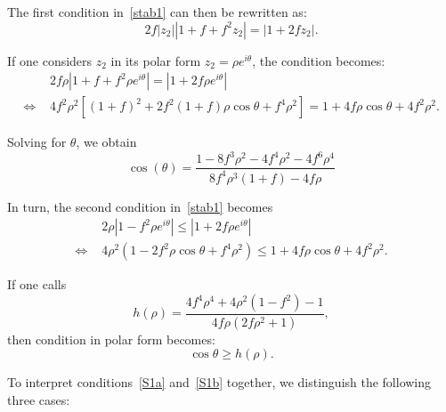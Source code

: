 \documentclass[10pt]{article}
\begin{document}
The first condition in~\eqref{stab1}  can then be rewritten as:
\[
2 f |z_2| |1 + f + f^2 z_2| = |1 + 2 f z_2|.
\]

If one considers $z_2$ in its polar form $z_2 = \rho e^{i\theta}$, the condition becomes:
\[
\begin{aligned}
&
    2 f \rho |1 + f + f^2 \rho e^{i \theta}| = |1 + 2 f \rho e^{i\theta}| \\
\iff\,\, &
    4 f^2 \rho^2 [(1 + f)^2 + 2 f^2 (1 + f) \rho \cos \theta + f^4 \rho^2]
    = 1 + 4 f \rho \cos \theta + 4 f^2 \rho^2.
\end{aligned}
\]

Solving for $\theta$, we obtain
\begin{equation} \label{S1a}
\cos(\theta) =
    \frac{1 - 8 f^3 \rho^2 - 4 f^4 \rho^2 - 4 f^6 \rho^4}{8 f^4 \rho^3 (1 + f) - 4 f \rho}
     \tag{S1a}
\end{equation}

In turn, the second condition in~\eqref{stab1} becomes
\[
\begin{aligned}
&
    2 \rho |1 - f^2 \rho e^{i\theta} |
    \leq |1 + 2 f \rho e^{i\theta}| \\
\iff\,\, &
    4 \rho^2 (1 - 2 f^2 \rho \cos \theta + f^4 \rho^2)
    \leq 1 + 4 f \rho \cos \theta + 4 f^2 \rho^2.
\end{aligned}
\]

If one calls
\begin{equation}
h(\rho) = \frac{4 f^4 \rho^4+4\rho^2(1-f^2)-1}{4f\rho(2f\rho^2+1)},
\end{equation}
then condition in polar form becomes:
\begin{equation}
\cos \theta \geq h(\rho). \tag{S1b} \label{S1b}
\end{equation}

To interpret conditions~\eqref{S1a} and~\eqref{S1b} together, we distinguish the following three cases:
\end{document}
